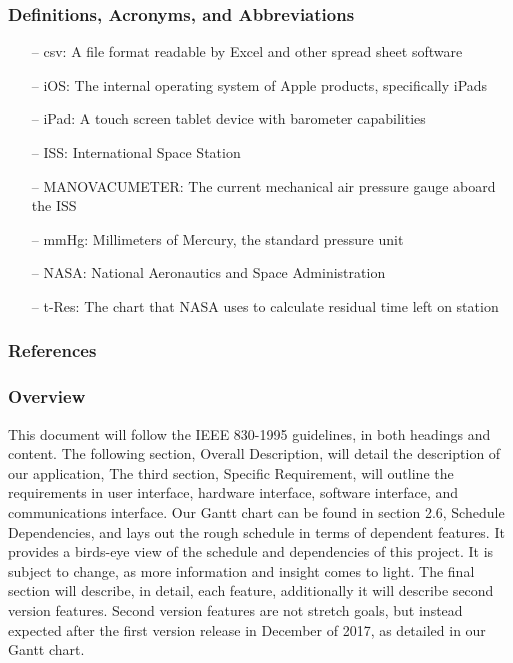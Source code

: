 \documentclass[onecolumn, draftclsnofoot,10pt, compsoc]{IEEEtran}
\begin{document}
\subsubsection{Definitions, Acronyms, and Abbreviations}
\begin{itemize}
\item[--] csv: A file format readable by Excel and other spread sheet software
\item[--] iOS: The internal operating system of Apple products, specifically iPads
\item[--] iPad: A touch screen tablet device with barometer capabilities
\item[--] ISS: International Space Station
\item[--] MANOVACUMETER: The current mechanical air pressure gauge aboard the ISS
\item[--] mmHg: Millimeters of Mercury, the standard pressure unit
\item[--] NASA: National Aeronautics and Space Administration
\item[--] t-Res: The chart that NASA uses to calculate residual time left on station
\end{itemize}

\subsubsection{References}

\subsubsection{Overview}
This document will follow the IEEE 830-1995 guidelines, in both headings and content.
The following section, Overall Description, will detail the description of our application,
The third section, Specific Requirement, will outline the requirements in user interface, hardware interface, software interface, and communications interface.
Our Gantt chart can be found in section 2.6, Schedule Dependencies, and lays out the rough schedule in terms of dependent features.
It provides a birds-eye view of the schedule and dependencies of this project.
It is subject to change, as more information and insight comes to light.
The final section will describe, in detail, each feature, additionally it will describe second version features.
Second version features are not stretch goals, but instead expected after the first version release in December of 2017, as detailed in our Gantt chart.
\end{document}
